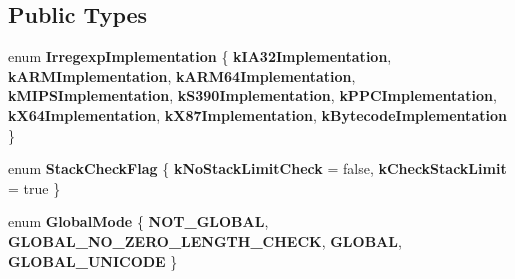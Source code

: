 \subsection*{Public Types}
\begin{DoxyCompactItemize}
\item 
\mbox{\label{classv8_1_1internal_1_1RegExpMacroAssembler_aa25bfd5e513b3364931b82afd32f087d}} 
enum {\bfseries Irregexp\+Implementation} \{ \newline
{\bfseries k\+I\+A32\+Implementation}, 
{\bfseries k\+A\+R\+M\+Implementation}, 
{\bfseries k\+A\+R\+M64\+Implementation}, 
{\bfseries k\+M\+I\+P\+S\+Implementation}, 
\newline
{\bfseries k\+S390\+Implementation}, 
{\bfseries k\+P\+P\+C\+Implementation}, 
{\bfseries k\+X64\+Implementation}, 
{\bfseries k\+X87\+Implementation}, 
\newline
{\bfseries k\+Bytecode\+Implementation}
 \}
\item 
\mbox{\label{classv8_1_1internal_1_1RegExpMacroAssembler_a91a9710d7239b05c338264daf2730f3b}} 
enum {\bfseries Stack\+Check\+Flag} \{ {\bfseries k\+No\+Stack\+Limit\+Check} = false, 
{\bfseries k\+Check\+Stack\+Limit} = true
 \}
\item 
\mbox{\label{classv8_1_1internal_1_1RegExpMacroAssembler_a8c5dd9fba6bb0f236a08e824e5b83198}} 
enum {\bfseries Global\+Mode} \{ {\bfseries N\+O\+T\+\_\+\+G\+L\+O\+B\+AL}, 
{\bfseries G\+L\+O\+B\+A\+L\+\_\+\+N\+O\+\_\+\+Z\+E\+R\+O\+\_\+\+L\+E\+N\+G\+T\+H\+\_\+\+C\+H\+E\+CK}, 
{\bfseries G\+L\+O\+B\+AL}, 
{\bfseries G\+L\+O\+B\+A\+L\+\_\+\+U\+N\+I\+C\+O\+DE}
 \}
\end{DoxyCompactItemize}
